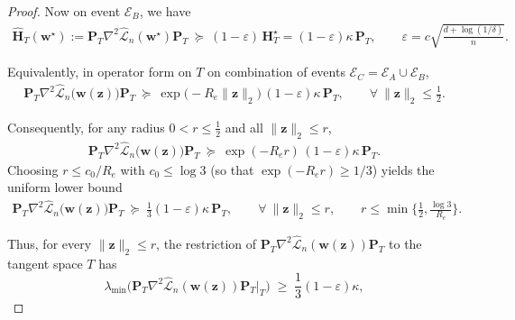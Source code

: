 \documentclass{article}
\theoremstyle{plain}
\theoremstyle{definition}
\theoremstyle{remark}
\begin{document}
{\begin{proof}
Now on event $\mathcal{E}_{B}$, we have
\begin{align}
\widehat{\mathbf H}_T(\mathbf w^\star)
:=
\mathbf P_T \nabla^2 \widehat{\mathcal L}_n(\mathbf w^\star)\mathbf P_T
~\succeq~
(1-\varepsilon)\,\mathbf H_T^\star
=
(1-\varepsilon)\kappa\,\mathbf P_T,
\qquad
\varepsilon = c\sqrt{\frac{d+\log(1/\delta)}{n}}.
\end{align}

Equivalently, in operator form on $T$ on combination of events $\mathcal{E}_{C} = \mathcal{E}_{A}\cup\mathcal{E}_{B}$,
\begin{align}
\mathbf P_T \nabla^{2}\widehat{\mathcal L}_{n}\!\big(\mathbf w(\mathbf z)\big)\mathbf P_T
~\succeq~
\exp\!\big(-R_{e}\|\mathbf z\|_{2}\big)\,(1-\varepsilon)\kappa\,\mathbf P_T,
\qquad \forall~\|\mathbf z\|_2\le\tfrac12.
\end{align}


Consequently, for any radius $0<r\le \tfrac12$ and all $\|\mathbf z\|_2\le r$,
\begin{align}
\mathbf P_T \nabla^{2}\widehat{\mathcal L}_{n}\!\big(\mathbf w(\mathbf z)\big)\mathbf P_T
~\succeq~
\exp(-R_e r)\,(1-\varepsilon)\kappa\,\mathbf P_T.
\label{eq:tangent-hess-uniform-ball}
\end{align}
Choosing $r\le c_0/R_e$ with $c_0\le \log 3$ (so that $\exp(-R_e r)\ge 1/3$) yields the uniform lower bound
\begin{align}
\mathbf P_T \nabla^{2}\widehat{\mathcal L}_{n}\!\big(\mathbf w(\mathbf z)\big)\mathbf P_T
~\succeq~
\frac{1}{3}(1-\varepsilon)\kappa\,\mathbf P_T,
\qquad \forall~\|\mathbf z\|_2\le r,
\qquad
r \le \min\Big\{\frac{1}{2},\frac{\log 3}{R_e}\Big\}.
\label{eq:tangent-hess-final}
\end{align}

Thus, for every $\|\mathbf z\|_2\le r$, the restriction of
$\mathbf P_T \nabla^{2}\widehat{\mathcal L}_{n}(\mathbf w(\mathbf z))\mathbf P_T$
to the tangent space $T$ has
\[
\lambda_{\min}\!\Big(\mathbf P_T \nabla^{2}\widehat{\mathcal L}_{n}(\mathbf w(\mathbf z))\mathbf P_T\big|_{T}\Big)
\;\ge\; \frac13(1-\varepsilon)\kappa,
\]



\end{proof}}
\end{document}

